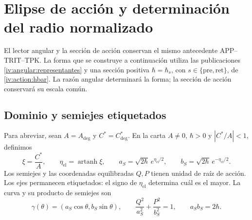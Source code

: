 \section{Elipse de acción y determinación del radio normalizado}
\label{iv:ellipse:section}

El lector angular y la sección de acción conservan el mismo
antecedente APP--TRIT--TPK. La forma que se construye a
continuación utiliza las publicaciones
\eqref{iv:angular:representantes} y una sección positiva
\(\hbar=\hbar_s\), con
\(s\in\{\mathrm{pre},\mathrm{ret}\}\), de
\eqref{iv:action:hbar}. La razón angular determinará la forma;
la sección de acción conservará su escala común.

\subsection{Dominio y semiejes etiquetados}
\label{iv:ellipse:dominio}

Para abreviar, sean \(A=A_{\deg}\) y \(C^*=C^*_{\deg}\).
En la carta \(A\ne0\), \(\hbar>0\) y \(|C^*/A|<1\),
definimos
\begin{equation}
 \xi=\frac{C^*}{A},\qquad
 \eta_{\mathrm{el}}=\operatorname{artanh}\xi,\qquad
 a_S=\sqrt{2\hbar}\,e^{\eta_{\mathrm{el}}/2},\qquad
 b_S=\sqrt{2\hbar}\,e^{-\eta_{\mathrm{el}}/2}.
 \label{iv:ellipse:semiejes}
\end{equation}
Los semiejes y las coordenadas equilibradas \(Q,P\) tienen
unidad de raíz de acción. Los ejes permanecen etiquetados:
el signo de \(\eta_{\mathrm{el}}\) determina cuál es el
mayor. La curva y su producto de semiejes son
\begin{equation}
 \gamma(\theta)=(a_S\cos\theta,b_S\sin\theta),\qquad
 \frac{Q^2}{a_S^2}+\frac{P^2}{b_S^2}=1,\qquad
 a_Sb_S=2\hbar.
 \label{iv:ellipse:curva}
\end{equation}

